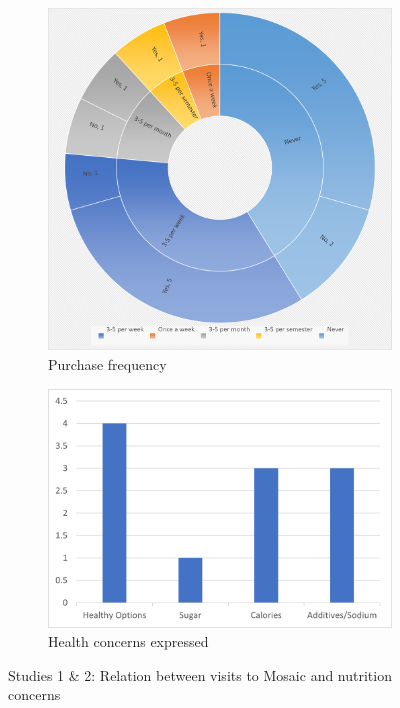 \documentclass[thesis]{fputhesis}
\begin{document}
\begin{body}
\begin{figure}[h]
    \centering
    \begin{subfigure}[b]{0.4\textwidth}
        \centering
         \includegraphics[scale=.38]{Images/Mosaic-use.png}
         \caption{Purchase frequency}
         \label{fig:mosaic-use}
    \end{subfigure}
    \begin{subfigure}[b]{0.4\textwidth}
        \centering
         \includegraphics[width=\textwidth]{Images/Health-concerns.png}
         \caption{Health concerns expressed}
         \label{fig:health-concerns}
    \end{subfigure}
    \caption{Studies 1 \& 2: Relation between visits to Mosaic and nutrition concerns}
    \label{fig:}
\end{figure}


\end{body}
\end{document}
